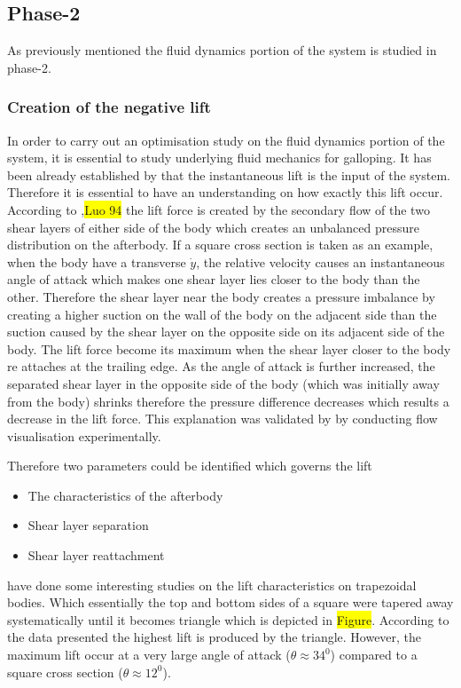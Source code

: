 \documentclass{article}
\newcommand{\hilight}[1]{\colorbox{yellow}{#1}}
\begin{document}
\subsection{Phase-2}

As previously mentioned the fluid dynamics portion of the system is studied in phase-2.

\subsubsection{Creation of the negative lift}

In order to carry out an optimisation study on the fluid dynamics portion of the system, it is essential to study underlying fluid mechanics for galloping. It has been already established by \cite{Parkinson1964} that the instantaneous lift is the input of the system. Therefore it is essential to have an understanding on how exactly this lift occur. According to \cite{Parkinson1989},\hilight{Luo 94} the lift force is created by the secondary flow of the two shear layers of either side of the body which creates an unbalanced pressure distribution on the afterbody. If a square cross section is taken as an example, when the body have a transverse $\dot{y}$, the relative velocity causes an instantaneous angle of attack which makes one shear layer lies closer to the body than the other. Therefore the shear layer near the body creates a pressure imbalance by creating a higher suction on the wall of the body on the adjacent side than the suction caused by the shear layer on the opposite side on its adjacent side of the body. The lift force become its maximum when the shear layer closer to the body re attaches at the trailing edge. As the angle of attack is further increased, the separated shear layer in the opposite side of the body (which was initially away from the body) shrinks therefore the pressure difference decreases which results a decrease in the lift force. This explanation was validated by \cite{Luo1994} by conducting flow visualisation experimentally.

Therefore two parameters could be identified which governs the lift 

\begin{itemize}
\item The characteristics of the afterbody
\item Shear layer separation
\item Shear layer reattachment 

\end{itemize}
\cite{Luo1994} have done some interesting studies on the lift characteristics on trapezoidal bodies. Which essentially the top and bottom sides of a square were tapered away systematically until it becomes triangle which is depicted in \hilight{Figure}. According to the data presented \cite{Luo1994} the highest lift is produced by the triangle. However, the maximum lift occur at a very large angle of attack ($\theta\approx 34^0 $) compared to a square cross section ($\theta\approx 12^0 $).
\end{document}
